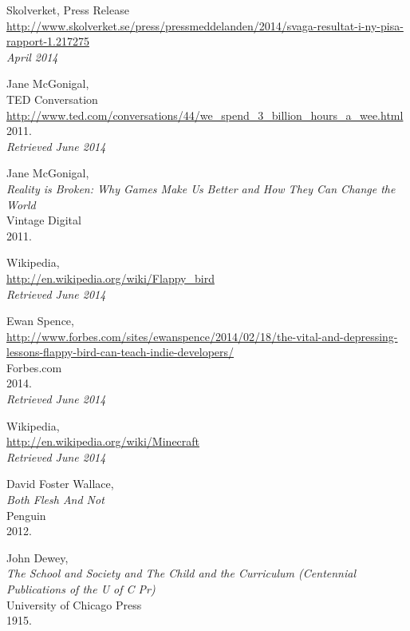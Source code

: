 \begin{thebibliography}{99}

  Skolverket, Press Release\\
  \url{http://www.skolverket.se/press/pressmeddelanden/2014/svaga-resultat-i-ny-pisa-rapport-1.217275} \\
  \emph{April 2014}

  Jane McGonigal, \\
  TED Conversation \\
  \url{http://www.ted.com/conversations/44/we_spend_3_billion_hours_a_wee.html} \\
  2011. \\
  \emph{Retrieved June 2014}

  Jane McGonigal, \\
  \emph{Reality is Broken: Why Games Make Us Better and How They Can Change the World} \\
  Vintage Digital \\
  2011.

  Wikipedia, \\
  \url{http://en.wikipedia.org/wiki/Flappy_bird} \\
  \emph{Retrieved June 2014}

  Ewan Spence, \\
  \url{http://www.forbes.com/sites/ewanspence/2014/02/18/the-vital-and-depressing-lessons-flappy-bird-can-teach-indie-developers/} \\
  Forbes.com \\
  2014. \\
  \emph{Retrieved June 2014}

  Wikipedia, \\
  \url{http://en.wikipedia.org/wiki/Minecraft} \\
  \emph{Retrieved June 2014}

  David Foster Wallace, \\
  \emph{Both Flesh And Not} \\
  Penguin \\
  2012.

  John Dewey, \\
  \emph{The School and Society and The Child and the Curriculum (Centennial Publications of the U of C Pr)} \\
  University of Chicago Press \\
  1915.


\end{thebibliography}
